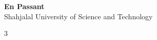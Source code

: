 \documentclass[9pt, a4paper]{extreport}
\begin{document}
\begin{center}
  {\huge \bfseries En Passant}\\[0.3em]
  {\large Shahjalal University of Science and Technology}\\[0.2em]
\end{center}

\begin{multicols*}{3}
  \tableofcontents
  \vspace*{9pt}

  
  
  
  
  
  
  
  
  
  
  
  
  
\end{multicols*}
\end{document}
